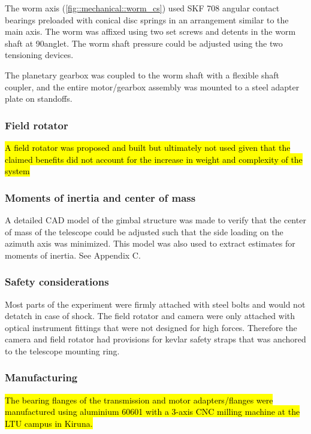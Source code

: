 The worm axis (\ref{fig::mechanical::worm_cs}) used SKF 708 angular contact bearings preloaded with conical disc springs in an arrangement similar to the main axis. The worm was affixed using two set screws and detents in the worm shaft at 90\degree anglet. The worm shaft pressure could be adjusted using the two tensioning devices. 

The planetary gearbox was coupled to the worm shaft with a flexible shaft coupler, and the entire motor/gearbox assembly was mounted to a steel adapter plate on standoffs. 

\subsubsection{Field rotator}
\hl{A field rotator was proposed and built but ultimately not used given that the claimed benefits did not account for the increase in weight and complexity of the system} 


\subsubsection{Moments of inertia and center of mass}

A detailed CAD model of the gimbal structure was made to verify that the center of mass of the telescope could be adjusted such that the side loading on the azimuth axis was minimized. This model was also used to extract estimates for moments of inertia. See Appendix C.

\subsubsection{Safety considerations}

Most parts of the experiment were firmly attached with steel bolts and would not detatch in case of shock. The field rotator and camera were only attached with optical instrument fittings that were not designed for high forces. Therefore the camera and field rotator had provisions for kevlar safety straps that was anchored to the telescope mounting ring. 

\subsubsection{Manufacturing}

\hl{The bearing flanges of the transmission and motor adapters/flanges were manufactured using aluminium 60601 with a 3-axis CNC milling machine at the LTU campus in Kiruna.}

